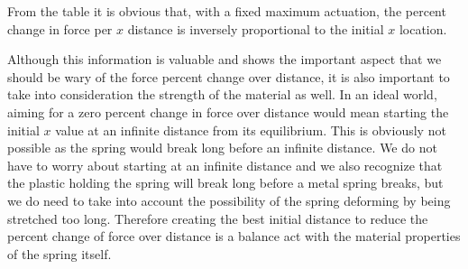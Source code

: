 \begin{table}[h!]
  \centering
  \caption{}
  \label{Tab:x_force}
\end{table}

From the table it is obvious that, with a fixed maximum actuation, the percent change in force per $ x $ distance is inversely proportional to the initial $ x $ location.

Although this information is valuable and shows the important aspect that we should be wary of the force percent change over distance, it is also important to take into consideration the strength of the material as well. In an ideal world, aiming for a zero percent change in force over distance would mean starting the initial $ x $ value at an infinite distance from its equilibrium. This is obviously not possible as the spring would break long before an infinite distance. We do not have to worry about starting at an infinite distance and we also recognize that the plastic holding the spring will break long before a metal spring breaks, but we do need to take into account the possibility of the spring deforming by being stretched too long. Therefore creating the best initial distance to reduce the percent change of force over distance is a balance act with the material properties of the spring itself.

